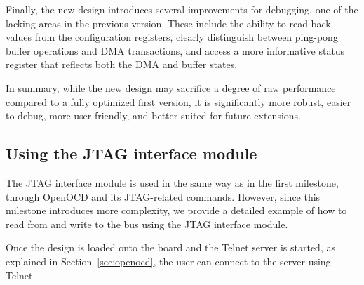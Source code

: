 \documentclass[a4paper,11pt,oneside]{report}
\begin{document}
Finally, the new design introduces several improvements for debugging, one of the lacking areas in the previous version.  
These include the ability to read back values from the configuration registers,  
clearly distinguish between ping-pong buffer operations and DMA transactions,  
and access a more informative status register that reflects both the DMA and buffer states.

In summary, while the new design may sacrifice a degree of raw performance compared to a fully optimized first version,  
it is significantly more robust, easier to debug, more user-friendly, and better suited for future extensions.

\subsection{Using the JTAG interface module}

The JTAG interface module is used in the same way as in the first milestone, through OpenOCD and its JTAG-related commands.  
However, since this milestone introduces more complexity, we provide a detailed example of how to read from and write to the bus using the JTAG interface module.

Once the design is loaded onto the board and the Telnet server is started, as explained in Section~\ref{sec:openocd}, the user can connect to the server using Telnet.
\end{document}
